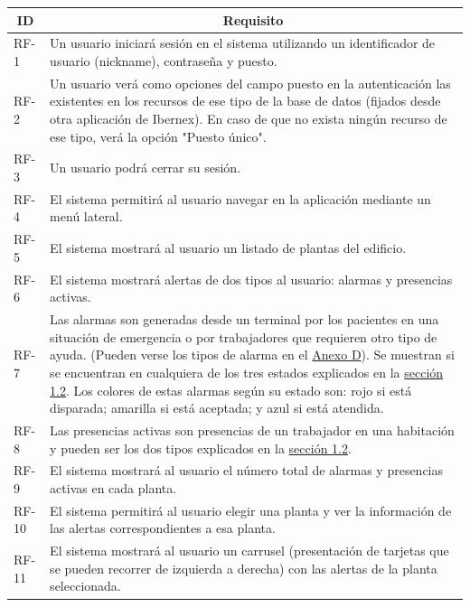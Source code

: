 \begin{longtable}{|p{1cm}|p{14cm}|}
	\hline
	\multicolumn{1}{|c|}{\centering \textbf{ID}} & \multicolumn{1}{c|}{\centering \textbf{Requisito}} \\
	\hline
	RF-1 	& 	Un usuario iniciará sesión en el sistema utilizando un identificador de usuario (nickname), contraseña y puesto. \\
	\hline
	RF-2	&	Un usuario verá como opciones del campo puesto en la autenticación las existentes en los recursos de ese tipo de la base de datos (fijados desde otra aplicación de Ibernex). En caso de que no exista ningún recurso de ese tipo, verá la opción "Puesto único".	\\
	\hline
	RF-3	&	Un usuario podrá cerrar su sesión.	\\
	\hline
	RF-4	&	El sistema permitirá al usuario navegar en la aplicación mediante un menú lateral. \\
	\hline
	RF-5	&	El sistema mostrará al usuario un listado de plantas del edificio. \\
	\hline
	RF-6	&	El sistema mostrará alertas de dos tipos al usuario: alarmas y presencias activas. \\
	\hline
	RF-7	&	Las alarmas son generadas desde un terminal por los pacientes en una situación de emergencia o por trabajadores que requieren otro tipo de ayuda. (Pueden verse los tipos de alarma en el \hyperref[anexo-d]{Anexo D}). Se muestran si se encuentran en cualquiera de los tres estados explicados en la \hyperref[section-objetivos]{sección 1.2}. Los colores de estas alarmas según su estado son: rojo si está disparada; amarilla si está aceptada; y azul si está atendida. \\
	\hline
	RF-8	&	Las presencias activas son presencias de un trabajador en una habitación y pueden ser los dos tipos explicados en la \hyperref[section-objetivos]{sección 1.2}. \\
	\hline
	RF-9	&	El sistema mostrará al usuario el número total de alarmas y presencias activas en cada planta. \\
	\hline
	RF-10	&	El sistema permitirá al usuario elegir una planta y ver la información de las alertas correspondientes a esa planta. \\
	\hline
	RF-11	&	El sistema mostrará al usuario un carrusel (presentación de tarjetas que se pueden recorrer de izquierda a derecha) con las alertas de la planta seleccionada. \\

\end{longtable}
